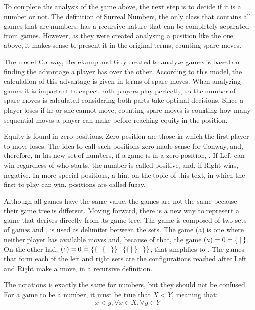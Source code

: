To complete the analysis of the game above, the next step is to decide if it is a number or not. The definition of Surreal Numbers, the only class that contains all games that are numbers, has a recursive nature that can be completely separated from games. However, as they were created analyzing a position like the one above\cite{CGT}, it makes sense to present it in the original terms, counting spare moves.

The model Conway, Berlekamp and Guy created to analyze games is based on finding the advantage a player has over the other. According to this model, the calculation of this advantage is given in terms of spare moves. When analyzing games it is important to expect both players play perfectly, so the number of spare moves is calculated considering both parts take optimal decisions. Since a player loses if he or she cannot move, counting spare moves is counting how many sequential moves a player can make before reaching equity in the position.

Equity is found in zero positions. Zero position are those in which the first player to move loses. The idea to call such positions zero made sense for Conway, and, therefore, in his new set of numbers, if a game \Gm is in a zero position, . If Left can win regardless of who starts, the number is called positive, and, if Right wins, negative. In more special positions, a hint on the topic of this text, in which the first to play can win, positions are called fuzzy.



Although all games have the same value, the games are not the same because their game tree is different. Moving forward, there is a new way to represent a game that derives directly from its game tree. The game is composed of two sets of games and $\mid$ is used as delimiter between the sets. The game (a) is one where neither player has available moves and, because of that, the game $(a) = 0 = \mbox{$\{\:|\:\}$}$. On the other had, $(c) = 0 = \mbox{$\{\mbox{$\{\:|\:\mbox{$\{\:|\:\}$}\}$}\:|\:\mbox{$\{\mbox{$\{\:|\:\}$}\:|\:\}$}\}$}$, that simplifies to . The games that form each of the left and right sets are the configurations reached after Left and Right make a move, in a recursive definition.

The notations is exactly the same for numbers, but they should not be confused. For a game   to be a number, it must be true that $X < Y$, meaning that:
$$x < y, \forall x \in X, \forall y \in Y$$

